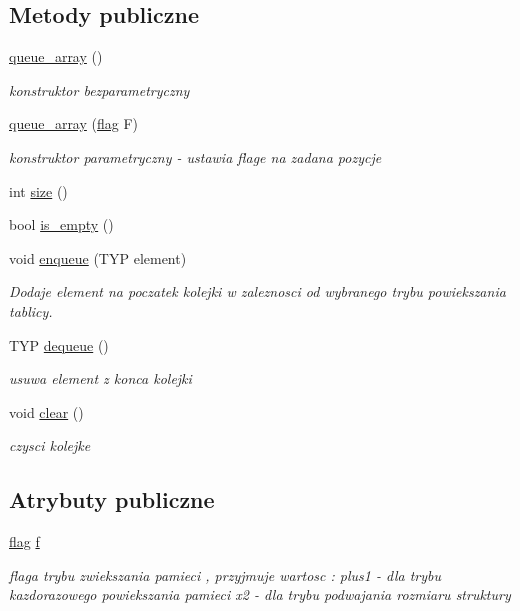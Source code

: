 \subsection*{Metody publiczne}
\begin{DoxyCompactItemize}
\item 
\hyperlink{classqueue__array_af651ba1c08e777af1ef23d1301819c58}{queue\-\_\-array} ()
\begin{DoxyCompactList}\small\item\em konstruktor bezparametryczny \end{DoxyCompactList}\item 
\hyperlink{classqueue__array_ad2c9f7906fad18d3daad605455210cb8}{queue\-\_\-array} (\hyperlink{stos_8hh_a7847560c748814fd3070e9149a9578bd}{flag} F)
\begin{DoxyCompactList}\small\item\em konstruktor parametryczny -\/ ustawia flage na zadana pozycje \end{DoxyCompactList}\item 
int \hyperlink{classqueue__array_a423093872e5cf4eb99f17ca1179ffa70}{size} ()
\item 
bool \hyperlink{classqueue__array_aa6ddf8e684f31a34f721e89ea83a7469}{is\-\_\-empty} ()
\item 
void \hyperlink{classqueue__array_a0c35f63c53ee3e3019fffde84bbf6bd1}{enqueue} (T\-Y\-P element)
\begin{DoxyCompactList}\small\item\em Dodaje element na poczatek kolejki w zaleznosci od wybranego trybu powiekszania tablicy. \end{DoxyCompactList}\item 
T\-Y\-P \hyperlink{classqueue__array_a67a036da416c976652c9039e5e101538}{dequeue} ()
\begin{DoxyCompactList}\small\item\em usuwa element z konca kolejki \end{DoxyCompactList}\item 
void \hyperlink{classqueue__array_acfe3b3e3ed5cc3b380d3f0d261ade3d9}{clear} ()
\begin{DoxyCompactList}\small\item\em czysci kolejke \end{DoxyCompactList}\end{DoxyCompactItemize}
\subsection*{Atrybuty publiczne}
\begin{DoxyCompactItemize}
\item 
\hyperlink{stos_8hh_a7847560c748814fd3070e9149a9578bd}{flag} \hyperlink{classqueue__array_a01c734086cf5e56c719b4d327cc36664}{f}
\begin{DoxyCompactList}\small\item\em flaga trybu zwiekszania pamieci , przyjmuje wartosc \-: plus1 -\/ dla trybu kazdorazowego powiekszania pamieci x2 -\/ dla trybu podwajania rozmiaru struktury \end{DoxyCompactList}\end{DoxyCompactItemize}
